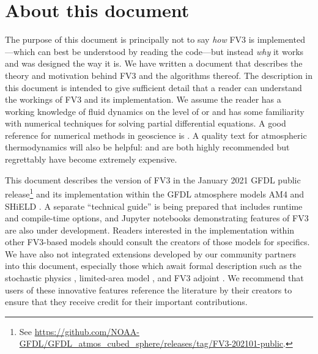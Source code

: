 \documentclass[10pt,letterpaper,margin=1in]{memoir}
\begin{document}
\section{About this document}


The purpose of this document is principally not to say \textit{how} FV3 is implemented---which can best be understood by reading the code---but instead \textit{why} it works and was designed the way it is.  We have written a document that describes the theory and motivation behind FV3 and the algorithms thereof. The description in this document is intended to give sufficient detail that a reader can understand the workings of FV3 and its implementation. We assume the reader has a working knowledge of fluid dynamics on the level of \citet{holton2013introduction} or \citet{kunducohendowling2015} and has some familiarity with numerical techniques for solving partial differential equations. A good reference for numerical methods in geoscience is \citet{durran2010numerical}. A quality text for atmospheric thermodynamics will also be helpful: \citet{Emanuel1994} and \citet{BohrenAlbrecht2000} are both highly recommended but regrettably have become extremely expensive. 

This document describes the version of FV3 in the January 2021 GFDL public release\footnote{See \href{{https://github.com/NOAA-GFDL/GFDL_atmos_cubed_sphere/releases/tag/FV3-202101-public}}{{https://github.com/NOAA-GFDL/GFDL_atmos_cubed_sphere/releases/tag/FV3-202101-public}}. } and its implementation within the GFDL atmosphere models AM4 \citep{Zhao2018a} and SHiELD \citep{Harris2020}. A separate ``technical guide'' is being prepared that includes runtime and compile-time options, and Jupyter notebooks demonstrating features of FV3 are also under development. Readers interested in the implementation within other FV3-based models should consult the creators of those models for specifics. We have also not integrated extensions developed by our community partners into this document, especially those which await formal description such as the stochastic physics \citep{Bengtsson2019}, limited-area model \citep[LAM;][]{PurserTong2017,Dong2020,Black2021}, and FV3 adjoint \citep{Holdaway2020}. We recommend that users of these innovative features reference the literature by their creators to ensure that they receive credit for their important contributions. 
\end{document}
